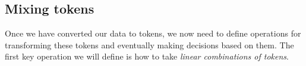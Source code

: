 

\subsection{Mixing tokens}
Once we have converted our data to tokens, we now need to define operations for transforming these tokens and eventually making decisions based on them. The first key operation we will define is how to take \textit{linear combinations of tokens}.


